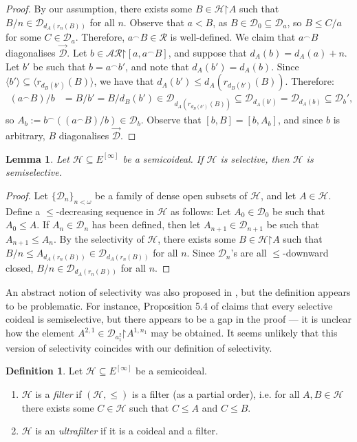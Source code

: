 \documentclass[10pt,a4paper]{amsart}
\theoremstyle{plain}
\numberwithin{equation}{section}
\newtheorem{lemma}[theorem]{Lemma}
\theoremstyle{definition}
\newtheorem{definition}[theorem]{Definition}
\renewcommand{\c}[1]{\langle #1 \rangle}
\newcommand{\cal}{\mathcal}
\newcommand{\restrictedto}{\mathord{\upharpoonright}}
\renewcommand{\H}{\cal{H}}
\newcommand{\D}{\cal{D}}
\begin{document}
\begin{proof}
    By our assumption, there exists some $B \in \H\restrictedto A$ such that $B/n \in \D_{d_A(r_n(B))}$ for all $n$. Observe that $a < B$, as $B \in \D_0 \subseteq \D_a$, so $B \leq C/a$ for some $C \in \D_a$. Therefore, $a^\frown B \in \cal{R}$ is well-defined. We claim that $a^\frown B$ diagonalises $\vec{\D}$. Let $b \in \cal{AR}\restrictedto[a,a^\frown B]$, and suppose that $d_A(b) = d_A(a) + n$. Let $b'$ be such that $b = a^\frown b'$, and note that $d_A(b') = d_A(b)$. Since $\c{b'} \subseteq \c{r_{d_B(b')}(B)}$, we have that $d_A(b') \leq d_A(r_{d_B(b')}(B))$. Therefore:
    \begin{align*}
        (a^\frown B)/b &= B/b' = B/d_B(b') \in \D_{d_A(r_{d_B(b')}(B))} \subseteq \D_{d_A(b')} = \D_{d_A(b)} \subseteq \D_b',
    \end{align*}
    so $A_b := b^\frown((a^\frown B)/b) \in \D_b$. Observe that $[b,B] = [b,A_b]$, and since $b$ is arbitrary, $B$ diagonalises $\vec{\D}$.
\end{proof}

\begin{lemma}
    Let $\H \subseteq E^{[\infty]}$ be a semicoideal. If $\H$ is selective, then $\H$ is semiselective.
\end{lemma}

\begin{proof}
    Let $\{\D_n\}_{n<\omega}$ be a family of dense open subsets of $\H$, and let $A \in \H$. Define a $\leq$-decreasing sequence in $\H$ as follows: Let $A_0 \in \D_0$ be such that $A_0 \leq A$. If $A_n \in \D_n$ has been defined, then let $A_{n+1} \in \D_{n+1}$ be such that $A_{n+1} \leq A_n$. By the selectivity of $\H$, there exists some $B \in \H\restrictedto A$ such that $B/n \leq A_{d_A(r_n(B))} \in \D_{d_A(r_n(B))}$ for all $n$. Since $\D_n$'s are all $\leq$-downward closed, $B/n \in \D_{d_A(r_n(B))}$ for all $n$.
\end{proof}

An abstract notion of selectivity was also proposed in \cite{DMN15}, but the definition appears to be problematic. For instance, Proposition 5.4 of \cite{DMN15} claims that every selective coideal is semiselective, but there appears to be a gap in the proof --- it is unclear how the element $A^{2,1} \in \D_{a_1^2}\restrictedto A^{1,n_1}$ may be obtained. It seems unlikely that this version of selectivity coincides with our definition of selectivity.

\begin{definition}
\label{def:filter}
    Let $\H \subseteq E^{[\infty]}$ be a semicoideal. 
    \begin{enumerate}
        \item $\H$ is a \emph{filter} if $(\H,\leq)$ is a filter (as a partial order), i.e. for all $A,B \in \H$ there exists some $C \in \H$ such that $C \leq A$ and $C \leq B$. 
            
        \item $\H$ is an \emph{ultrafilter} if it is a coideal and a filter.
    \end{enumerate}
\end{definition}
\end{document}
